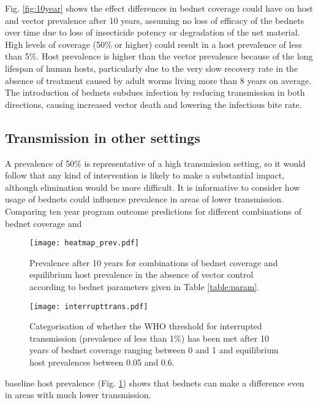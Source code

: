 \documentclass[5p,times]{elsarticle}
\begin{document}
Fig. \ref{fig:10year} shows the effect differences in bednet coverage could have on host and vector prevalence after 10 years, assuming no loss of efficacy of the bednets over time due to loss of insecticide potency or degradation of the net material. High levels of coverage (50\% or higher) could result in a host prevalence of less than 5\%. Host prevalence is higher than the vector prevalence because of the long lifespan of human hosts, particularly due to the very slow recovery rate in the absence of treatment caused by adult worms living more than 8 years on average. The introduction of bednets subdues infection by reducing transmission in both directions, causing increased vector death and lowering the infectious bite rate.

\subsection{Transmission in other settings}

A prevalence of 50\% is representative of a high transmission setting, so it would follow that any kind of intervention is likely to make a substantial impact, although elimination would be more difficult. It is informative to consider how usage of bednets could influence prevalence in areas of lower transmission. Comparing ten year program outcome predictions for different combinations of bednet coverage and \begin{figure}[h]
\begin{center}
\texttt{[image: heatmap\_prev.pdf]}
\caption{Prevalence after 10 years for combinations of bednet coverage and equilibrium host prevalence in the absence of vector control according to bednet parameters given in Table \ref{table:param}.}
\label{fig:heat_prev}
\end{center}
\end{figure}
\begin{figure}[h]
\begin{center}
\texttt{[image: interrupttrans.pdf]}
\caption{Categorisation of whether the WHO threshold for interrupted transmission (prevalence of less than 1\%) has been met after 10 years of bednet coverage ranging between 0 and 1 and equilibrium host prevalences between 0.05 and 0.6.}
\label{fig:interrupt}
\end{center}
\end{figure} baseline host prevalence (Fig. \ref{fig:heat_prev}) shows that bednets can make a difference even in areas with much lower transmission.
\end{document}
